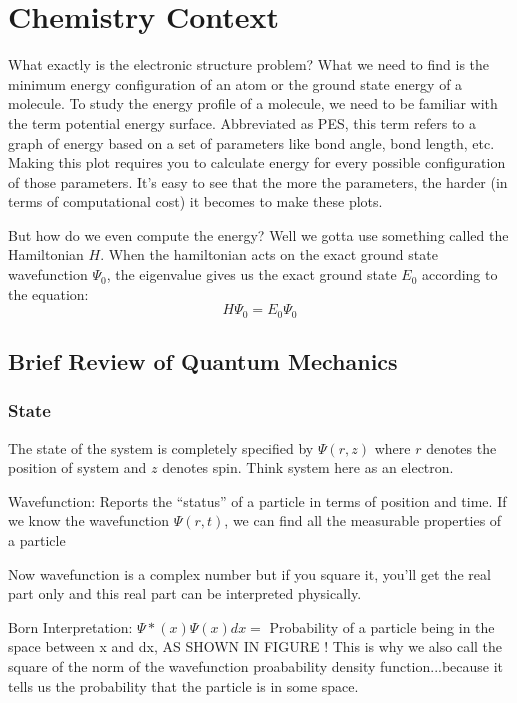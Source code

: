 \documentclass{article}
\begin{document}
\section{Chemistry Context}

What exactly is the electronic structure problem? What we need to find is the
minimum energy configuration of an atom or the ground state energy of a molecule.
To study the energy profile of a molecule, we need to be familiar
with the term potential energy surface. Abbreviated as PES, this term refers
to a graph of energy based on a set of parameters like bond angle, bond length,
etc. Making this plot requires you to calculate energy for every possible
configuration of those parameters. It's easy to see that the more the parameters,
the harder (in terms of computational cost) it becomes to make these plots.

But how do we even compute the energy? Well we gotta use something called the
Hamiltonian \(H\). When the hamiltonian acts on the exact ground state
wavefunction \(\Psi_{0}\), the eigenvalue gives us the exact ground state
\(E_0\) according to the equation:
\[H\Psi_{0} = E_0\Psi_{0}\]

\subsection{Brief Review of Quantum Mechanics}

\subsubsection{State}

The state of the system is completely specified by \(\Psi(r, z)\) where
\(r\) denotes the position of system and \(z\) denotes spin. Think system
here as an electron.

Wavefunction: Reports the ``status'' of a particle in terms of position and
time. If we know the wavefunction \(\Psi(r, t)\), we can find all the
measurable properties of a particle

Now wavefunction is a complex number but if you square it, you'll get the
real part only and this real part can be interpreted physically.

Born Interpretation:
\(\Psi*(x)\Psi(x) dx = \) Probability of a particle being in the space
between x and dx, AS SHOWN IN FIGURE ! This is why we also call the square
of the norm of the wavefunction proabability density function...because
it tells us the probability that the particle is in some space.
\end{document}
